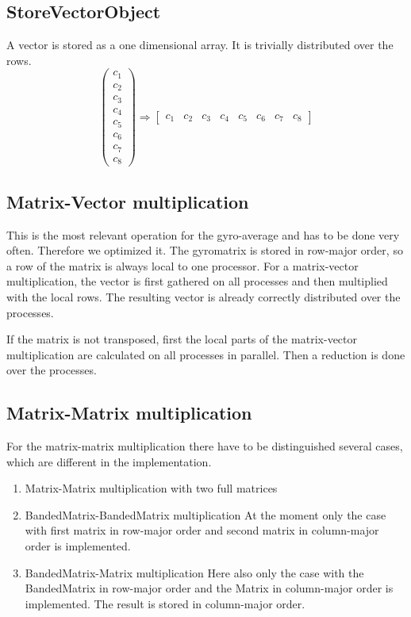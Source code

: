 \subsection{StoreVectorObject}
A vector is stored as a one dimensional array. It is trivially
distributed over the rows.
\begin{displaymath}
  \left(
  \begin{array}{c}
    c_1\\
    c_2\\
    c_3\\
    c_4\\
    \hline
    c_5\\
    c_6\\
    c_7\\
    c_8
  \end{array}\right)\Longrightarrow
\left[
  \begin{array}{cccc|cccc}
    c_1 & c_2 & c_3 & c_4 & c_5 & c_6 & c_7 & c_8
  \end{array}
\right]
\end{displaymath}

\subsection{Matrix-Vector multiplication}
This is the most relevant operation for the gyro-average and has to be
done very often. Therefore we optimized it. The gyromatrix is stored
in row-major order, so a row of the matrix is always local to one
processor. 
For a matrix-vector multiplication, the vector is first gathered on
all processes and then multiplied with the local rows. The resulting
vector is already correctly distributed over the processes.

If the matrix is not transposed, first the local parts of the
matrix-vector multiplication are calculated on all processes in
parallel. Then a reduction is done over the processes.

\subsection{Matrix-Matrix multiplication}
For the matrix-matrix multiplication there have to be distinguished
several cases, which are different in the implementation.
\begin{enumerate}
\item Matrix-Matrix multiplication with two full matrices
\item BandedMatrix-BandedMatrix multiplication
  At the moment only the case with first matrix in row-major order and
  second matrix in column-major order is implemented.
\item BandedMatrix-Matrix multiplication
  Here also only the case with the BandedMatrix in row-major order and
  the Matrix in column-major order is implemented. The result is
  stored in column-major order.
\end{enumerate}


